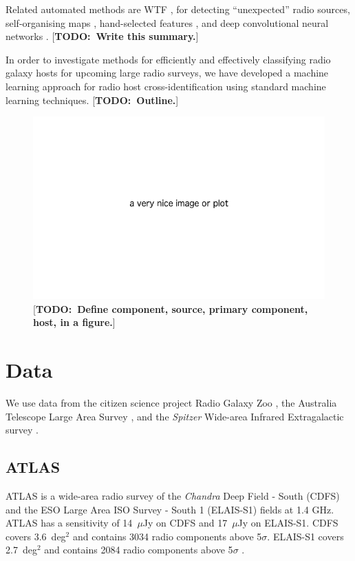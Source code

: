 \documentclass[fleqn,usenatbib,usedcolumn]{mnras}
\newcommand{\todo}[1]{ {\color{red}[{\bf TODO:~{#1}}]} }
\begin{document}
  Related automated methods are WTF \citep{citeneeded}, for detecting
  ``unexpected'' radio sources, self-organising maps \citep{polsterer15pink},
  hand-selected features \citep{proctor06}, and deep convolutional neural
  networks \citep{aniyan17cnn}. \todo{Write this summary.}

  In order to investigate methods for efficiently and effectively classifying
  radio galaxy hosts for upcoming large radio surveys, we have developed a
  machine learning approach for radio host cross-identification using standard
  machine learning techniques. \todo{Outline.}

  \begin{figure}
    \includegraphics[width=\linewidth]{images/placeholder.png}
    \caption{\todo{Define component, source, primary component, host, in a figure.}}
  \end{figure}

\section{Data}\label{data}
    
  We use data from the citizen science project Radio Galaxy Zoo
  \citep{banfield15}, the Australia Telescope Large Area Survey
  \citep[ATLAS;][]{franzen15}, and the \emph{Spitzer} Wide-area Infrared
  Extragalactic survey \citep[SWIRE;][]{lonsdale03swire, surace05swire}.

  \subsection{ATLAS}\label{sec:atlas}

    ATLAS \citep{franzen15} is a wide-area radio survey of the \emph{Chandra}
    Deep Field - South (CDFS) and the ESO Large Area ISO Survey - South 1
    (ELAIS-S1) fields at 1.4 GHz. ATLAS has a sensitivity of 14~$\mu$Jy on CDFS
    and 17~$\mu$Jy on ELAIS-S1. CDFS covers 3.6~deg$^2$ and contains 3034 radio
    components above 5$\sigma$. ELAIS-S1 covers 2.7~deg$^2$ and contains 2084
    radio components above 5$\sigma$ \citep{franzen15}.
\end{document}
